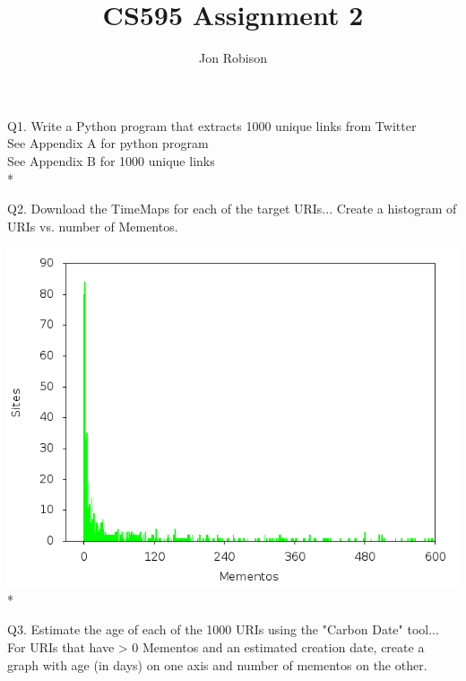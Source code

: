 \documentclass{article}
\begin{document}
\author{Jon Robison}
\title{CS595 Assignment 2}
\maketitle

Q1. Write a Python program that extracts 1000 unique links from Twitter \\
See Appendix A for python program \\
See Appendix B for 1000 unique links
\\*

Q2. Download the TimeMaps for each of the target URIs... Create a histogram of
URIs vs. number of Mementos. \\
\graphicspath{{q2/}}
\includegraphics[scale=.4]{histogram.png}
\\*

Q3. Estimate the age of each of the 1000 URIs using the "Carbon Date" tool...
For URIs that have > 0 Mementos and an estimated creation date, create a graph
with age (in days) on one axis and number of mementos on the other. \\
\end{document}
